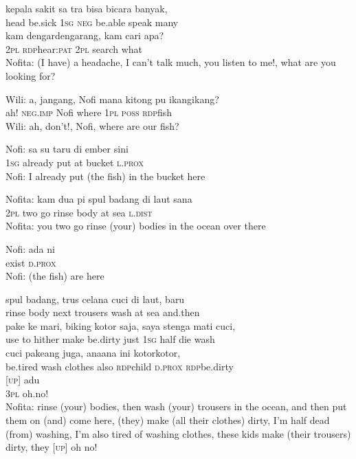 \ea
{}   kepala    {sakit}   sa   tra    {bisa}   bicara   banyak,\\
   {}   head    {be.sick}   \textsc{1sg}   \textsc{neg}    {be.able}   speak   many\\
\gll kam    {dengar{\Tilde}dengarang,}    {kam}    {cari}    {apa?}\\
  \textsc{2pl}    {\textsc{rdp}{\Tilde}hear\textsc{:pat}}    {\textsc{2pl}}    {search}    {what}\\
\glt
Nofita: (I have) a headache, I can’t talk much, you listen to me!, what are you looking for?
\z

\ea
\gll   Wili:   a,   jangang,   Nofi   mana   kitong   pu   ikang{\Tilde}ikang?\\
{}  ah!   \textsc{neg.imp}   Nofi   where   \textsc{1pl}   \textsc{poss}   \textsc{rdp}{\Tilde}fish\\
\glt
Wili: ah, don’t!, Nofi, where are our fish?
\z

\ea
\gll   Nofi:   sa   su   taru   di   ember   sini\\
{} \textsc{1sg}   already   put   at   bucket   \textsc{l.prox}\\
\glt
Nofi: I already put (the fish) in the bucket here
\z

\ea
\gll   Nofita:   kam   dua   pi   spul   badang   di   laut   sana\\
 {} \textsc{2pl}   two   go   rinse   body   at   sea   \textsc{l.dist}\\
\glt Nofita: you two go rinse (your) bodies in the ocean over there
\z

\ea
\gll   Nofi:   ada   ni\\
  {} exist   \textsc{d.prox}\\
\glt
Nofi: (the fish) are here
\z

\ea
{}    {spul}    {badang,}    {trus}    {celana}    {cuci}    {di}    {laut,}    {baru}\\
   {}    {rinse}    {body}    {next}    {trousers}    {wash}    {at}    {sea}    {and.then}\\
\gll pake    {ke}    {mari,}    {biking}    {kotor}    {saja,}    {saya}    {stenga}   mati   cuci,\\
  use    {to}    {hither}    {make}    {be.dirty}    {just}    {\textsc{1sg}}    {half}   die   wash\\
    {cuci}    {pakeang}    {juga,}    {ana{\Tilde}ana}    {ini}    {kotor{\Tilde}kotor,}\\
   {be.tired}    {wash}    {clothes}    {also}    {\textsc{rdp}{\Tilde}child}    {\textsc{d.prox}}    {\textsc{rdp}{\Tilde}be.dirty}\\
    {\upshape\textsc{[up]}}    {adu}\\
   {\textsc{3pl}}    {}    {oh.no!}\\
\glt
Nofita: rinse (your) bodies, then wash (your) trousers in the ocean, and then put them on (and) come here, (they) make (all their clothes) dirty, I’m half dead (from) washing, I’m also tired of washing clothes, these kids make (their trousers) dirty, they [\textsc{up}] oh no!
\z

